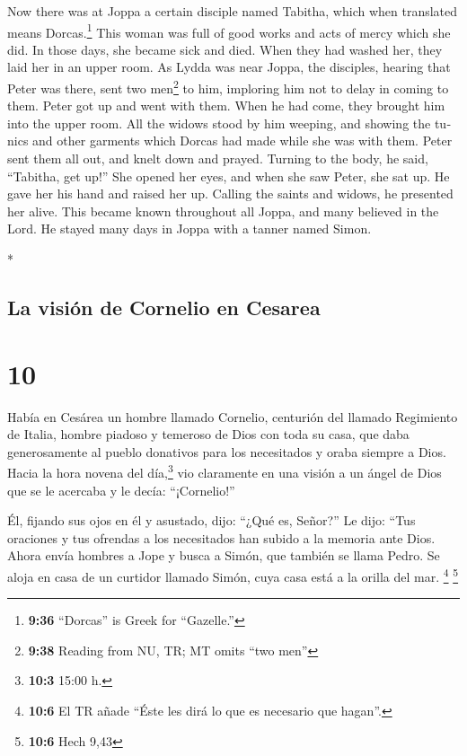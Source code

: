\begin{paracol}{2}
\begin{otherlanguage}{english}
 Now there was at Joppa a certain disciple named Tabitha,
which when translated means Dorcas.\footnote{\textbf{9:36} ``Dorcas'' is
  Greek for ``Gazelle.''} This woman was full of good works and acts of
mercy which she did.  In those days, she became sick and
died. When they had washed her, they laid her in an upper room.
 As Lydda was near Joppa, the disciples, hearing that
Peter was there, sent two men\footnote{\textbf{9:38} Reading from NU,
  TR; MT omits ``two men''} to him, imploring him not to delay in coming
to them.  Peter got up and went with them. When he had
come, they brought him into the upper room. All the widows stood by him
weeping, and showing the tunics and other garments which Dorcas had made
while she was with them.  Peter sent them all out, and
knelt down and prayed. Turning to the body, he said, ``Tabitha, get
up!'' She opened her eyes, and when she saw Peter, she sat up.
 He gave her his hand and raised her up. Calling the
saints and widows, he presented her alive.  This became
known throughout all Joppa, and many believed in the Lord.
 He stayed many days in Joppa with a tanner named Simon.

\end{otherlanguage}

\switchcolumn[0]*

\hypertarget{la-visiuxf3n-de-cornelio-en-cesarea}{%
\subsection{La visión de Cornelio en
Cesarea}\label{la-visiuxf3n-de-cornelio-en-cesarea}}

\hypertarget{section-18}{%
\section{10}\label{section-18}}

 Había en Cesárea un hombre llamado Cornelio, centurión
del llamado Regimiento de Italia,  hombre piadoso y
temeroso de Dios con toda su casa, que daba generosamente al pueblo
donativos para los necesitados y oraba siempre a Dios. 
Hacia la hora novena del día,\footnote{\textbf{10:3} 15:00 h.} vio
claramente en una visión a un ángel de Dios que se le acercaba y le
decía: ``¡Cornelio!''

 Él, fijando sus ojos en él y asustado, dijo: ``¿Qué es,
Señor?'' Le dijo: ``Tus oraciones y tus ofrendas a los necesitados han
subido a la memoria ante Dios.  Ahora envía hombres a Jope
y busca a Simón, que también se llama Pedro.  Se aloja en
casa de un curtidor llamado Simón, cuya casa está a la orilla del mar.
\footnote{\textbf{10:6} El TR añade ``Éste les dirá lo que es necesario
  que hagan''.} \footnote{\textbf{10:6} Hech 9,43}


\end{paracol}
